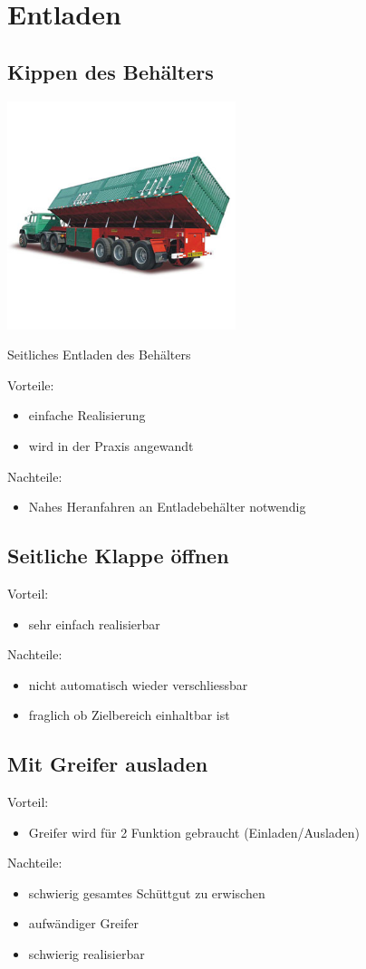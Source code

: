 \section{Entladen}
\subsection{Kippen des Behälters}
\includegraphics[width=0.5\textwidth]{Images/Entladen1.jpg}

Seitliches Entladen des Behälters

Vorteile:
\begin{itemize}
\item einfache Realisierung
\item wird in der Praxis angewandt
\end{itemize}

Nachteile:
\begin{itemize}
\item Nahes Heranfahren an Entladebehälter notwendig
\end{itemize}

\subsection{Seitliche Klappe öffnen}

Vorteil:
\begin{itemize}
\item sehr einfach realisierbar
\end{itemize}

Nachteile:
\begin{itemize}
\item nicht automatisch wieder verschliessbar
\item fraglich ob Zielbereich einhaltbar ist
\end{itemize}

\subsection{Mit Greifer ausladen}

Vorteil:
\begin{itemize}
\item Greifer wird für 2 Funktion gebraucht (Einladen/Ausladen)
\end{itemize}

Nachteile:
\begin{itemize}
\item schwierig gesamtes Schüttgut zu erwischen
\item aufwändiger Greifer
\item schwierig realisierbar
\end{itemize}